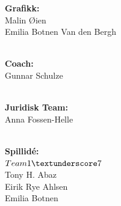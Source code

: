 \documentclass[paper=a4]{article}
\begin{document}
\begin{center}
\textbf{Grafikk:} \\
Malin Øien \\
Emilia Botnen Van den Bergh \\ \

\textbf{Coach:} \\
Gunnar Schulze \\ \ 

\textbf{Juridisk Team:} \\ 
Anna Fossen-Helle \\ \

\textbf{Spillidé:} \\
$Team 1\textunderscore7$\\
Tony H. Abaz \\
Eirik Rye Ahlsen \\
Emilia Botnen

\end{center}
\end{document}
